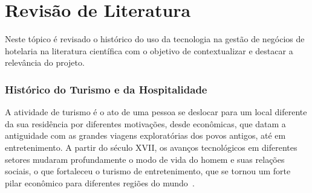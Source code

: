 \documentclass[
	12pt,				%
	openany,			%
	oneside,			%
	a4paper,			%
	english,			%
	french,				%
	spanish,			%
	brazil				%
	]{abntex2}
\begin{document}


\chapter{Revisão de Literatura}
Neste tópico é revisado o histórico do uso da tecnologia na gestão de negócios de hotelaria na literatura científica com o objetivo de contextualizar e destacar a relevância do projeto.
\subsection{Histórico do Turismo e da Hospitalidade} 
A atividade de turismo é o ato de uma pessoa se deslocar para um local diferente da sua residência por diferentes motivações, desde econômicas, que datam a antiguidade com as grandes viagens exploratórias dos povos antigos, até em entretenimento.  A partir do século XVII, os avanços tecnológicos em diferentes setores mudaram profundamente o modo de vida do homem e suas relações sociais, o que fortaleceu o turismo de entretenimento, que se tornou um forte pilar econômico para diferentes regiões do mundo~\cite{ignarra2013}.
\end{document}
